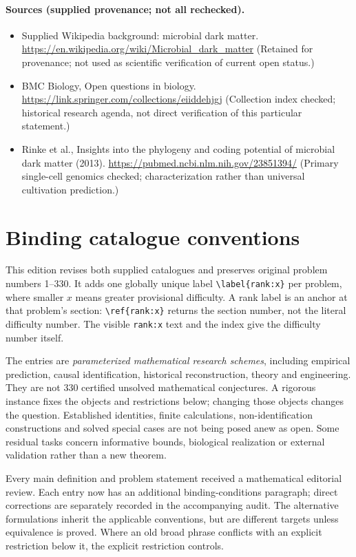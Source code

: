 \documentclass[11pt]{article}
\begin{document}
\paragraph{Sources (supplied provenance; not all rechecked).} \begin{itemize}
\item Supplied Wikipedia background: microbial dark matter. \url{https://en.wikipedia.org/wiki/Microbial_dark_matter} (Retained for provenance; not used as scientific verification of current open status.)
\item BMC Biology, Open questions in biology. \url{https://link.springer.com/collections/eiiddehjgj} (Collection index checked; historical research agenda, not direct verification of this particular statement.)
\item Rinke et al., Insights into the phylogeny and coding potential of microbial dark matter (2013). \url{https://pubmed.ncbi.nlm.nih.gov/23851394/} (Primary single-cell genomics checked; characterization rather than universal cultivation prediction.)
\end{itemize}


\section*{Binding catalogue conventions}
This edition revises both supplied catalogues and preserves original problem numbers 1--330. It adds one globally unique label \verb|\label{rank:x}| per problem, where smaller $x$ means greater provisional difficulty. A rank label is an anchor at that problem's section: \verb|\ref{rank:x}| returns the section number, not the literal difficulty number. The visible \texttt{rank:x} text and the index give the difficulty number itself.

The entries are \emph{parameterized mathematical research schemes}, including empirical prediction, causal identification, historical reconstruction, theory and engineering. They are not 330 certified unsolved mathematical conjectures. A rigorous instance fixes the objects and restrictions below; changing those objects changes the question. Established identities, finite calculations, non-identification constructions and solved special cases are not being posed anew as open. Some residual tasks concern informative bounds, biological realization or external validation rather than a new theorem.

Every main definition and problem statement received a mathematical editorial review. Each entry now has an additional binding-conditions paragraph; direct corrections are separately recorded in the accompanying audit. The alternative formulations inherit the applicable conventions, but are different targets unless equivalence is proved. Where an old broad phrase conflicts with an explicit restriction below it, the explicit restriction controls.
\end{document}
